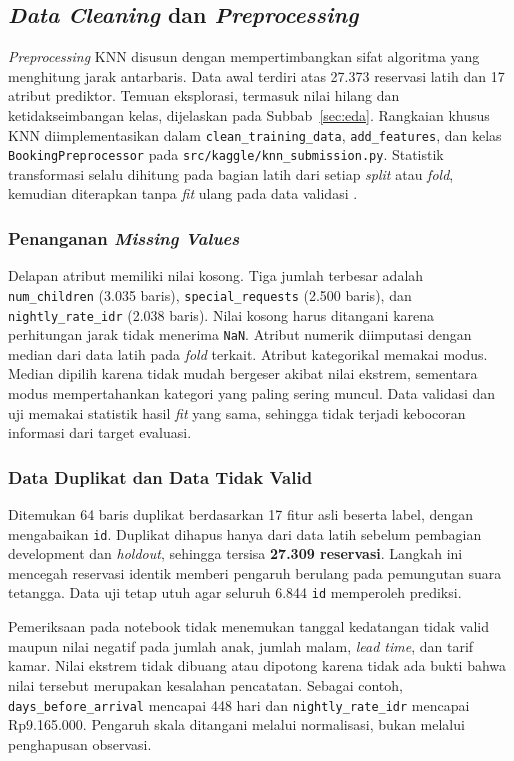 \subsection{\textit{Data Cleaning} dan \textit{Preprocessing}}
\label{subsec:knn-preprocessing}

\textit{Preprocessing} KNN disusun dengan mempertimbangkan sifat algoritma yang menghitung jarak antarbaris. Data awal terdiri atas 27.373 reservasi latih dan 17 atribut prediktor. Temuan eksplorasi, termasuk nilai hilang dan ketidakseimbangan kelas, dijelaskan pada Subbab~\ref{sec:eda}. Rangkaian khusus KNN diimplementasikan dalam \texttt{clean\_training\_data}, \texttt{add\_features}, dan kelas \texttt{BookingPreprocessor} pada \nolinkurl{src/kaggle/knn_submission.py}. Statistik transformasi selalu dihitung pada bagian latih dari setiap \textit{split} atau \textit{fold}, kemudian diterapkan tanpa \textit{fit} ulang pada data validasi \cite{slide-dataprep}.

\subsubsection{Penanganan \textit{Missing Values}}
Delapan atribut memiliki nilai kosong. Tiga jumlah terbesar adalah \texttt{num\_children} (3.035 baris), \texttt{special\_requests} (2.500 baris), dan \texttt{nightly\_rate\_idr} (2.038 baris). Nilai kosong harus ditangani karena perhitungan jarak tidak menerima \texttt{NaN}. Atribut numerik diimputasi dengan median dari data latih pada \textit{fold} terkait. Atribut kategorikal memakai modus. Median dipilih karena tidak mudah bergeser akibat nilai ekstrem, sementara modus mempertahankan kategori yang paling sering muncul. Data validasi dan uji memakai statistik hasil \textit{fit} yang sama, sehingga tidak terjadi kebocoran informasi dari target evaluasi.

\subsubsection{Data Duplikat dan Data Tidak Valid}
Ditemukan 64 baris duplikat berdasarkan 17 fitur asli beserta label, dengan mengabaikan \texttt{id}. Duplikat dihapus hanya dari data latih sebelum pembagian development dan \textit{holdout}, sehingga tersisa \textbf{27.309 reservasi}. Langkah ini mencegah reservasi identik memberi pengaruh berulang pada pemungutan suara tetangga. Data uji tetap utuh agar seluruh 6.844 \texttt{id} memperoleh prediksi.

Pemeriksaan pada notebook tidak menemukan tanggal kedatangan tidak valid maupun nilai negatif pada jumlah anak, jumlah malam, \textit{lead time}, dan tarif kamar. Nilai ekstrem tidak dibuang atau dipotong karena tidak ada bukti bahwa nilai tersebut merupakan kesalahan pencatatan. Sebagai contoh, \texttt{days\_before\_arrival} mencapai 448 hari dan \texttt{nightly\_rate\_idr} mencapai Rp9.165.000. Pengaruh skala ditangani melalui normalisasi, bukan melalui penghapusan observasi.

